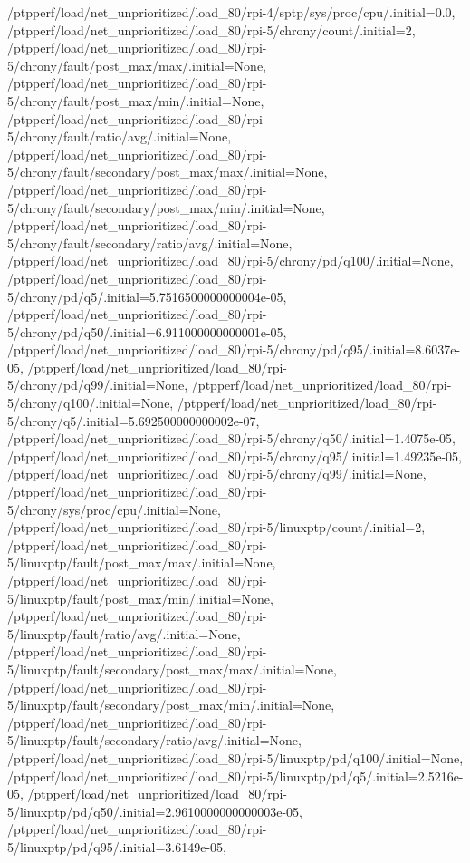 {    /ptpperf/load/net_unprioritized/load_80/rpi-4/sptp/sys/proc/cpu/.initial=0.0,
    /ptpperf/load/net_unprioritized/load_80/rpi-5/chrony/count/.initial=2,
    /ptpperf/load/net_unprioritized/load_80/rpi-5/chrony/fault/post_max/max/.initial=None,
    /ptpperf/load/net_unprioritized/load_80/rpi-5/chrony/fault/post_max/min/.initial=None,
    /ptpperf/load/net_unprioritized/load_80/rpi-5/chrony/fault/ratio/avg/.initial=None,
    /ptpperf/load/net_unprioritized/load_80/rpi-5/chrony/fault/secondary/post_max/max/.initial=None,
    /ptpperf/load/net_unprioritized/load_80/rpi-5/chrony/fault/secondary/post_max/min/.initial=None,
    /ptpperf/load/net_unprioritized/load_80/rpi-5/chrony/fault/secondary/ratio/avg/.initial=None,
    /ptpperf/load/net_unprioritized/load_80/rpi-5/chrony/pd/q100/.initial=None,
    /ptpperf/load/net_unprioritized/load_80/rpi-5/chrony/pd/q5/.initial=5.7516500000000004e-05,
    /ptpperf/load/net_unprioritized/load_80/rpi-5/chrony/pd/q50/.initial=6.911000000000001e-05,
    /ptpperf/load/net_unprioritized/load_80/rpi-5/chrony/pd/q95/.initial=8.6037e-05,
    /ptpperf/load/net_unprioritized/load_80/rpi-5/chrony/pd/q99/.initial=None,
    /ptpperf/load/net_unprioritized/load_80/rpi-5/chrony/q100/.initial=None,
    /ptpperf/load/net_unprioritized/load_80/rpi-5/chrony/q5/.initial=5.692500000000002e-07,
    /ptpperf/load/net_unprioritized/load_80/rpi-5/chrony/q50/.initial=1.4075e-05,
    /ptpperf/load/net_unprioritized/load_80/rpi-5/chrony/q95/.initial=1.49235e-05,
    /ptpperf/load/net_unprioritized/load_80/rpi-5/chrony/q99/.initial=None,
    /ptpperf/load/net_unprioritized/load_80/rpi-5/chrony/sys/proc/cpu/.initial=None,
    /ptpperf/load/net_unprioritized/load_80/rpi-5/linuxptp/count/.initial=2,
    /ptpperf/load/net_unprioritized/load_80/rpi-5/linuxptp/fault/post_max/max/.initial=None,
    /ptpperf/load/net_unprioritized/load_80/rpi-5/linuxptp/fault/post_max/min/.initial=None,
    /ptpperf/load/net_unprioritized/load_80/rpi-5/linuxptp/fault/ratio/avg/.initial=None,
    /ptpperf/load/net_unprioritized/load_80/rpi-5/linuxptp/fault/secondary/post_max/max/.initial=None,
    /ptpperf/load/net_unprioritized/load_80/rpi-5/linuxptp/fault/secondary/post_max/min/.initial=None,
    /ptpperf/load/net_unprioritized/load_80/rpi-5/linuxptp/fault/secondary/ratio/avg/.initial=None,
    /ptpperf/load/net_unprioritized/load_80/rpi-5/linuxptp/pd/q100/.initial=None,
    /ptpperf/load/net_unprioritized/load_80/rpi-5/linuxptp/pd/q5/.initial=2.5216e-05,
    /ptpperf/load/net_unprioritized/load_80/rpi-5/linuxptp/pd/q50/.initial=2.9610000000000003e-05,
    /ptpperf/load/net_unprioritized/load_80/rpi-5/linuxptp/pd/q95/.initial=3.6149e-05,
}
